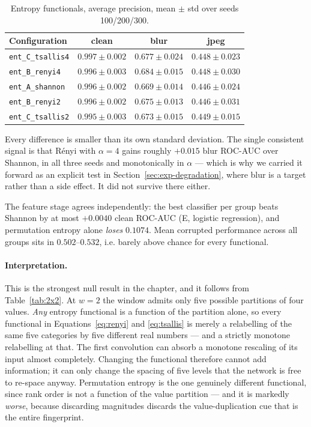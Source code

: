 \begin{table}[h]
  \centering
  \caption{Entropy functionals, average precision, mean $\pm$ std over seeds
  100/200/300.}
  \label{tab:entropy-seeds}
  \begin{tabular}{lccc}
    \toprule
    Configuration & clean & blur & jpeg \\
    \midrule
    \texttt{ent\_C\_tsallis4} & $0.997 \pm 0.002$ & $0.677 \pm 0.024$ & $0.448 \pm 0.023$ \\
    \texttt{ent\_B\_renyi4}   & $0.996 \pm 0.003$ & $0.684 \pm 0.015$ & $0.448 \pm 0.030$ \\
    \texttt{ent\_A\_shannon}  & $0.996 \pm 0.002$ & $0.669 \pm 0.014$ & $0.446 \pm 0.024$ \\
    \texttt{ent\_B\_renyi2}   & $0.996 \pm 0.002$ & $0.675 \pm 0.013$ & $0.446 \pm 0.031$ \\
    \texttt{ent\_C\_tsallis2} & $0.995 \pm 0.003$ & $0.673 \pm 0.015$ & $0.449 \pm 0.015$ \\
    \bottomrule
  \end{tabular}
\end{table}

Every difference is smaller than its own standard deviation. The single
consistent signal is that Rényi with $\alpha=4$ gains roughly $+0.015$ blur
ROC-AUC over Shannon, in all three seeds and monotonically in $\alpha$ --- which
is why we carried it forward as an explicit test in
Section~\ref{sec:exp-degradation}, where blur is a target rather than a side
effect. It did not survive there either.

The feature stage agrees independently: the best classifier per group beats
Shannon by at most $+0.0040$ clean ROC-AUC (E, logistic regression), and
permutation entropy alone \emph{loses} $0.1074$. Mean corrupted performance
across all groups sits in $0.502$--$0.532$, i.e. barely above chance for every
functional.

\paragraph{Interpretation.} This is the strongest null result in the chapter,
and it follows from Table~\ref{tab:2x2}. At $w=2$ the window admits only five
possible partitions of four values. \emph{Any} entropy functional is a function
of the partition alone, so every functional in Equations~\ref{eq:renyi} and
\ref{eq:tsallis} is merely a relabelling of the same five categories by five
different real numbers --- and a strictly monotone relabelling at that. The
first convolution can absorb a monotone rescaling of its input almost
completely. Changing the functional therefore cannot add information; it can
only change the spacing of five levels that the network is free to re-space
anyway. Permutation entropy is the one genuinely different functional, since
rank order is not a function of the value partition --- and it is markedly
\emph{worse}, because discarding magnitudes discards the value-duplication cue
that is the entire fingerprint.

